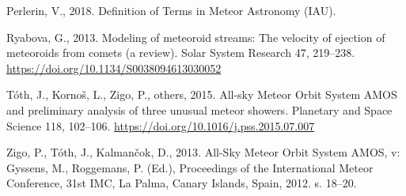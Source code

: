 \hypertarget{ref-imo-meteor}{}
Perlerin, V., 2018. Definition of Terms in Meteor Astronomy (IAU).

\hypertarget{ref-ryabova2013}{}
Ryabova, G., 2013. Modeling of meteoroid streams: The velocity of
ejection of meteoroids from comets (a review). Solar System Research 47,
219--238. \url{https://doi.org/10.1134/S0038094613030052}

\hypertarget{ref-toth2015}{}
Tóth, J., Kornoš, L., Zigo, P., others, 2015. All-sky Meteor Orbit
System AMOS and preliminary analysis of three unusual meteor showers.
Planetary and Space Science 118, 102--106.
\url{https://doi.org/10.1016/j.pss.2015.07.007}

\hypertarget{ref-zigo2013}{}
Zigo, P., Tóth, J., Kalmančok, D., 2013. All-Sky Meteor Orbit System
AMOS, v: Gyssens, M., Roggemans, P. (Ed.), Proceedings of the
International Meteor Conference, 31st IMC, La Palma, Canary Islands,
Spain, 2012. s. 18--20.

